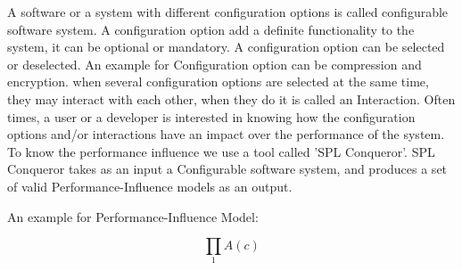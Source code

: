 \label{background}


 
A software or a system with different configuration options is called configurable software system. A configuration option add a definite functionality to the system, it can be optional or mandatory. A configuration option can be selected or deselected. An example for Configuration option can be compression and encryption.
when several configuration options are selected at the same time, they may interact with each other, when they do it is called an Interaction.
Often times, a user or a developer is interested in knowing how the configuration options and/or interactions have an impact over the performance of the system. To know the performance influence we use a tool called 'SPL Conqueror'.
SPL Conqueror takes as an input a Configurable software system, and produces a set of valid Performance-Influence models as an output.

An example for Performance-Influence Model: 

\begin{equation*}
  \prod_{1} A{(c)}
\end{equation*}

